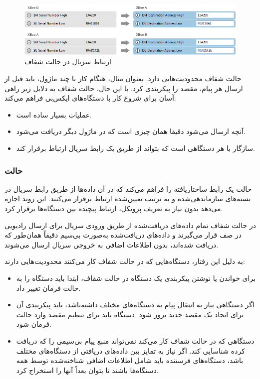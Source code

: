 \begin{figure}[!h]
\centering\includegraphics[scale=.7]{transparent_config.png}
\caption{ارتباط سریال در حالت شفاف \cite{Digi}}\label{fig:transparent_config}
\end{figure}

حالت شفاف محدودیت‌هایی دارد. بعنوان مثال، هنگام کار با چند ماژول، باید قبل از ارسال هر پیام، مقصد را پیکربندی کرد. با این حال، حالت شفاف به دلایل زیر راهی آسان برای شروع کار با دستگاه‌های ایکس‌بی فراهم می‌کند:

\begin{itemize}
\item عملیات بسیار ساده است.
\item آنچه ارسال می‌شود دقیقا همان چیزی است که در ماژول دیگر دریافت می‌شود.
\item سازگار با هر دستگاهی است که بتواند از طریق یک رابط سریال ارتباط برقرار کند.
\end{itemize}

\subsubsection{حالت }

حالت  یک رابط ساختاریافته را فراهم می‌کند که در آن داده‌ها از طریق رابط سریال در بسته‌های سازماندهی‌شده و به ترتیب تعیین‌شده ارتباط برقرار می‌کنند. این روند اجازه می‌دهد بدون نیاز به تعریف پروتکل، ارتباط پیچیده بین دستگاه‌ها برقرار کرد\cite{Digi}.

در حالت شفاف تمام داده‌های دریافت‌شده از طریق ورودی سریال برای ارسال رادیویی در صف قرار می‌گیرند و داده‌های دریافت‌شده به‌صورت بی‌سیم دقیقاً همان‌طور که دریافت شده‌اند، بدون اطلاعات اضافی به خروجی سریال ارسال می‌شوند\cite{Digi}.

به دلیل این رفتار، دستگاه‌هایی که در حالت شفاف کار می‌کنند محدودیت‌هایی دارند:
\begin{itemize}
\item برای خواندن یا نوشتن پیکربندی یک دستگاه در حالت شفاف، ابتدا باید دستگاه را به حالت فرمان تغییر داد.
\item اگر دستگاهی نیاز به انتقال پیام به دستگاه‌های مختلف داشته‌باشد، باید پیکربندی آن برای ایجاد یک مقصد جدید بروز شود. دستگاه باید برای تنظیم مقصد وارد حالت فرمان شود.
\item دستگاهی که در حالت شفاف کار می‌کند نمی‌تواند منبع پیام بی‌سیمی را که دریافت کرده شناسایی کند. اگر نیاز به تمایز بین داده‌های دریافتی از دستگاه‌های مختلف باشد، دستگاه‌های فرستنده باید شامل اطلاعات اضافی شناخته‌شده توسط همه دستگاه‌ها باشند تا بتوان بعداً آنها را استخراج کرد.
\end{itemize}

